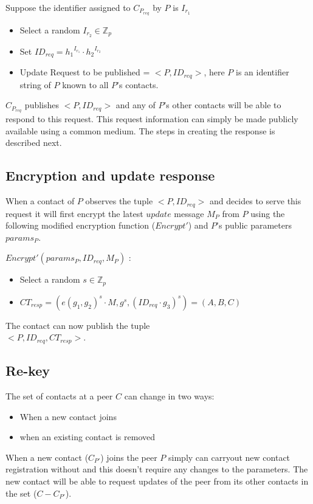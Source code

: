 Suppose the identifier assigned to $C_{P_{req}}$ by $P$ is $I_{r_1}$
\begin{itemize}
\item Select a random $I_{r_2}\in \mathbb{Z}_p$
\item Set $ID_{req} = {h_1}^{I_{r_1}} \cdot {h_2}^{I_{r_2}}$
\item Update Request to be published  = $<P, ID_{req}>$, here $P$ is an identifier string of $P$ known to all $P$'s contacts.
\end{itemize}

$C_{P_{req}}$ publishes $<P, ID_{req}>$ and any of $P$'s other contacts will be able to respond to this request. This request information can simply be made publicly available using a common medium. The steps in creating the response is described next.

\subsection{Encryption and update response}
When a contact of $P$ observes the tuple $<P, ID_{req}>$ and decides to serve this request it will first encrypt the latest $update$ message $M_P$ from $P$ using the following modified encryption function ($Encrypt'$) and $P$'s public parameters $params_P$. 

$Encrypt' (params_P, ID_{req}, M_P)$ :

\begin{itemize}
	\item Select a random $s \in \mathbb{Z}_p$ 
	\item $CT_{resp} = (e(g_1, g_2)^s \cdot M,  g^s,  {({ID_{req}} \cdot {g_3})}^s) = (A, B, C)$
\end{itemize}

The contact can now publish the tuple \\$<P, ID_{req}, CT_{resp}>$.


\subsection{Re-key}
The set of contacts at a peer $C$ can change in two ways:
\begin{itemize}
\item When a new contact joins
\item when an existing contact is removed
\end{itemize}

When a new contact ($C_{P'}$) joins the peer $P$ simply can carryout new contact registration without and this doesn't require any changes to the parameters. The new contact will be able to request updates of the peer from its other contacts in the set ($C - C_{P'}$). 

